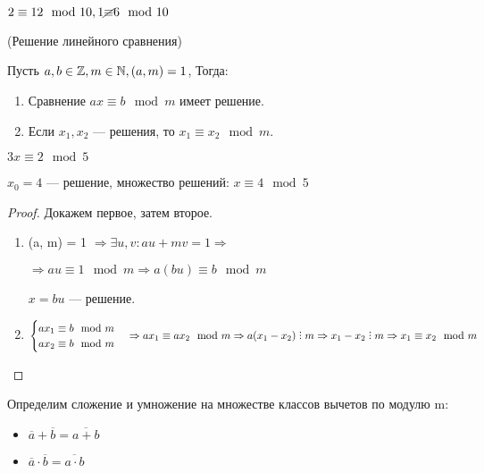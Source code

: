 \begin{remark}
  $2 \equiv 12 \mod 10, 1 \cancel{\equiv} 6 \mod 10$
\end{remark}

\begin{property} (Решение линейного сравнения)

  
  Пусть $a, b \in \mathbb{Z}, m \in \mathbb{N}, (a, m) = 1$, Тогда:

  \begin{enumerate}
    \item Сравнение $ax \equiv b \mod m$ имеет решение.
    \item Если $x_1, x_2$ --- решения, то $x_1 \equiv x_2 \mod m$.
  \end{enumerate}
\end{property}

\begin{eg}
  $3x \equiv 2 \mod 5$

  $x_0 = 4$ --- решение, множество решений: $x \equiv 4 \mod 5$
\end{eg}

\begin{proof}

  Докажем первое, затем второе.  
  \begin{enumerate}
    \item (a, m) = 1 $\Rightarrow \exists u, v: au + mv = 1 \Rightarrow$
    
    $\Rightarrow au \equiv 1 \mod m \Rightarrow a(bu) \equiv b \mod m$

    $x = bu$ --- решение.
    \item $\begin{cases}
      ax_1 \equiv b \mod m \\
      ax_2 \equiv b \mod m 
    \end{cases} \Rightarrow ax_1 \equiv ax_2 \mod m \Rightarrow a(x_1 - x_2) \divby m \Rightarrow x_1 - x_2 \divby m \Rightarrow x_1 \equiv x_2 \mod m$
    
    
  \end{enumerate}
\end{proof}

\begin{definition}
  Определим сложение и умножение на множестве классов вычетов по модулю m:
  \begin{itemize}
    \item $\overline{a} + \overline{b} = \overline{a + b}$
    \item $\overline{a} \cdot \overline{b} = \overline{a \cdot b}$ 
  \end{itemize}
\end{definition}

